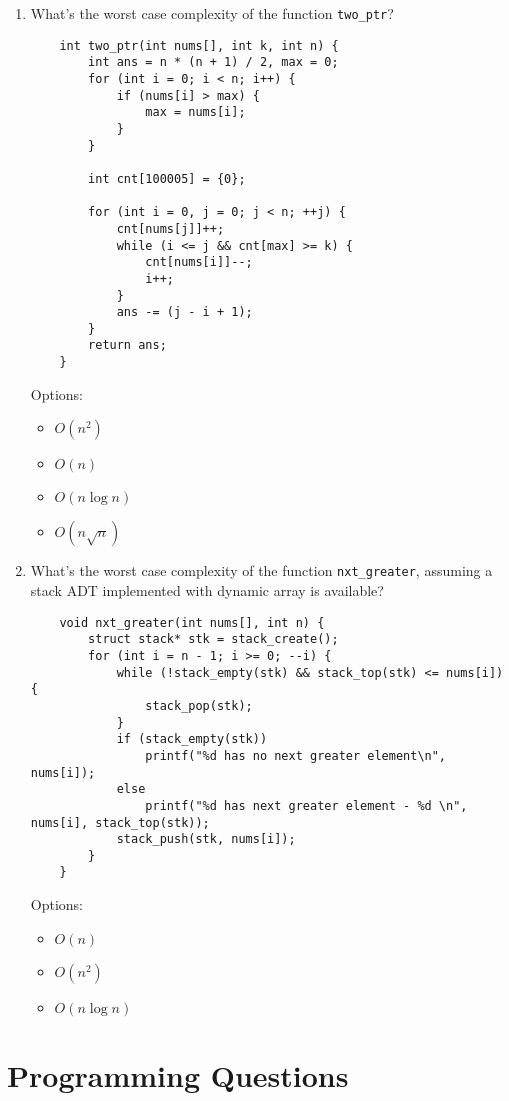 \documentclass{article}
\begin{document}
\begin{enumerate}
    \item What’s the worst case complexity of the function \texttt{two\_ptr}?
    \begin{lstlisting}
    int two_ptr(int nums[], int k, int n) {
        int ans = n * (n + 1) / 2, max = 0;
        for (int i = 0; i < n; i++) {
            if (nums[i] > max) {
                max = nums[i];
            }
        }

        int cnt[100005] = {0};

        for (int i = 0, j = 0; j < n; ++j) {
            cnt[nums[j]]++;
            while (i <= j && cnt[max] >= k) {
                cnt[nums[i]]--;
                i++;
            }
            ans -= (j - i + 1);
        }
        return ans;
    }
    \end{lstlisting}
    Options:
    \begin{itemize}
        \item \( O(n^2) \)
        \item \( O(n) \)
        \item \( O(n \log n) \)
        \item \( O(n \sqrt{n}) \)
    \end{itemize}

    \newpage
    \item What’s the worst case complexity of the function \texttt{nxt\_greater}, assuming a stack ADT implemented with dynamic array is available?
    \begin{lstlisting}
    void nxt_greater(int nums[], int n) {
        struct stack* stk = stack_create();
        for (int i = n - 1; i >= 0; --i) {
            while (!stack_empty(stk) && stack_top(stk) <= nums[i]) {
                stack_pop(stk);
            }
            if (stack_empty(stk)) 
                printf("%d has no next greater element\n", nums[i]);
            else 
                printf("%d has next greater element - %d \n", nums[i], stack_top(stk));
            stack_push(stk, nums[i]);
        }
    }
    \end{lstlisting}
    Options:
    \begin{itemize}
        \item \( O(n) \)
        \item \( O(n^2) \)
        \item \( O(n \log n) \)
    \end{itemize}

\end{enumerate}

\newpage
\section*{Programming Questions}
\end{document}
